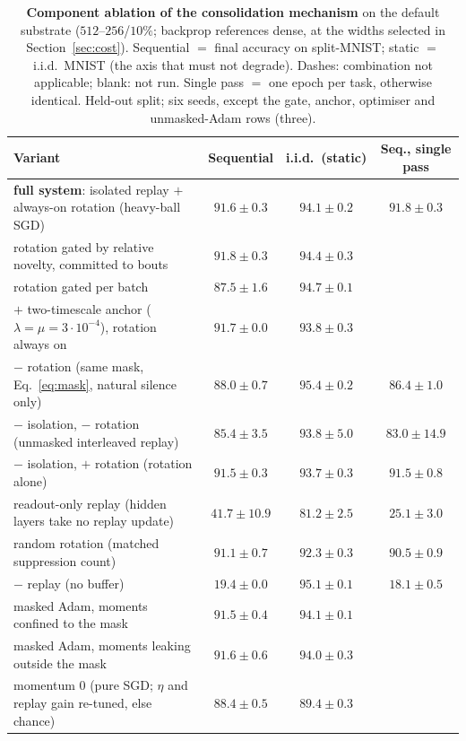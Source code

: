 \documentclass{article}
\begin{document}
\begin{table}[t]
\centering
\caption{\textbf{Component ablation of the consolidation mechanism} on the default substrate
($512$--$256$/$10\%$; backprop references dense, at the widths selected in
Section~\ref{sec:cost}). Sequential $=$ final accuracy
on split-MNIST; static $=$ i.i.d.\ MNIST (the axis that must not degrade). Dashes:
combination not applicable; blank: not run. Single pass $=$ one epoch per task, otherwise
identical. Held-out split; six seeds, except the gate, anchor, optimiser and unmasked-Adam
rows (three).}
\label{tab:ablation}
\footnotesize\setlength{\tabcolsep}{4pt}
\begin{tabular}{@{}lccc@{}}
\toprule
Variant & Sequential & i.i.d.\ (static) & Seq., single pass \\
\midrule
\textbf{full system}: isolated replay $+$ always-on rotation (heavy-ball SGD) & $\mathbf{91.6\pm0.3}$ & $94.1\pm0.2$ & $\mathbf{91.8\pm0.3}$ \\
\quad rotation gated by relative novelty, committed to bouts & $91.8\pm0.3$ & $94.4\pm0.3$ &  \\
\quad rotation gated per batch & $87.5\pm1.6$ & $94.7\pm0.1$ &  \\
$+$ two-timescale anchor ($\lambda{=}\mu{=}3{\cdot}10^{-4}$), rotation always on & $91.7\pm0.0$ & $93.8\pm0.3$ &  \\
$-$ rotation (same mask, Eq.~\ref{eq:mask}, natural silence only) & $88.0\pm0.7$ & $95.4\pm0.2$ & $86.4\pm1.0$ \\
$-$ isolation, $-$ rotation (unmasked interleaved replay) & $85.4\pm3.5$ & $93.8\pm5.0$ & $83.0\pm14.9$ \\
$-$ isolation, $+$ rotation (rotation alone) & $91.5\pm0.3$ & $93.7\pm0.3$ & $91.5\pm0.8$ \\
readout-only replay (hidden layers take no replay update) & $41.7\pm10.9$ & $81.2\pm2.5$ & $25.1\pm3.0$ \\
random rotation (matched suppression count) & $91.1\pm0.7$ & $92.3\pm0.3$ & $90.5\pm0.9$ \\
$-$ replay (no buffer) & $19.4\pm0.0$ & $95.1\pm0.1$ & $18.1\pm0.5$ \\
\midrule
masked Adam, moments confined to the mask & $91.5\pm0.4$ & $94.1\pm0.1$ &  \\
masked Adam, moments leaking outside the mask & $91.6\pm0.6$ & $94.0\pm0.3$ &  \\
momentum $0$ (pure SGD; $\eta$ and replay gain re-tuned, else chance) & $88.4\pm0.5$ & $89.4\pm0.3$ &  \\

\end{tabular}
\end{table}
\end{document}
